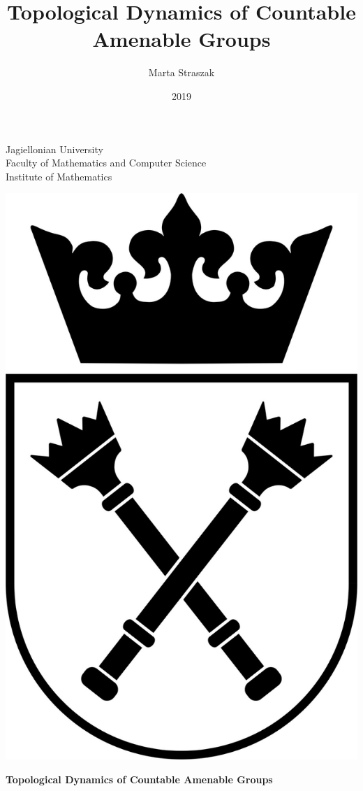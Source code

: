 \documentclass[10pt, a4paper, twoside,openright]{report}
\title{Topological Dynamics of Countable Amenable Groups}
\author{Marta Straszak}
\date{2019}
\begin{document}
\begin{titlepage}
\thispagestyle{empty}
\begin{center}
\textsf{\large Jagiellonian University\\Faculty of Mathematics and Computer Science\\Institute of Mathematics}
\vspace{5ex}%

\includegraphics[scale=0.2]{Graphics/logoUJ.jpg}
\vfill%


{\textbf{\fontsize{20}{30}\selectfont   Topological Dynamics of Countable Amenable Groups\\}}
\vspace{5ex}%


\end{center}
\end{titlepage}
\end{document}
